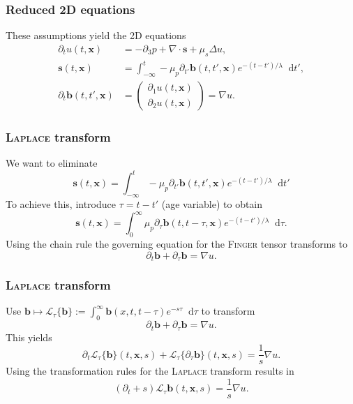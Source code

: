 \documentclass[12pt,a4paper,handout]{beamer}
\theoremstyle{definition}
\theoremstyle{plain}
\newcommand{\bfb}{\bm{b}}
\newcommand{\bfs}{\bm{s}}
\newcommand{\bfx}{\bm{x}}
\newcommand{\D}{\mathop{}\!\mathrm{d}}
\begin{document}
\begin{frame}
    \frametitle{Reduced 2D equations}
    These assumptions yield the 2D equations 
    \begin{align*}
    \partial_t u(t,\bfx) &= -\partial_3 p +\nabla\cdot \bfs+\mu_s\Delta u,\\
    \bfs(t,\bfx) &=\int_{-\infty}^t-\mu_p\partial_{t'}\bfb(t,t',\bfx)e^{-(t-t')/\lambda}\D t',\label{eq:s2D}\\
    \partial_t\bfb(t,t',\bfx)&=
    \begin{pmatrix}
    \partial_1 u(t,\bfx)\\\partial_2 u(t,\bfx)
    \end{pmatrix}=\nabla u.
    \end{align*}
\end{frame}
\begin{frame}
    \frametitle{\textsc{Laplace} transform}
    We want to eliminate \begin{equation*}
        \bfs(t,\bfx)=\int_{-\infty}^t-\mu_p\partial_{t'}\bfb(t,t',\bfx)e^{-(t-t')/\lambda}\D t'
    \end{equation*}
    To achieve this, introduce $\tau=t-t'$ (age variable) to obtain
    \begin{equation*}
    \bfs(t,\bfx)=\int_0^\infty\mu_p\partial_\tau\bfb(t,t-\tau,\bfx)e^{-(t-t')/\lambda}\D\tau.
    \end{equation*}
    Using the chain rule the governing equation for the \textsc{Finger} tensor transforms to  
    \begin{equation*}
    \partial_t \bfb +\partial_\tau\bfb=\nabla u.
    \end{equation*}
\end{frame}
\begin{frame}
    \frametitle{\textsc{Laplace} transform}
    Use $\bfb\mapsto \mathcal{L}_\tau\{\bfb\}:=\int_0^\infty \bfb(x,t,t-\tau)e^{-s\tau}\D \tau$ to transform
    \begin{equation*}
    \partial_t \bfb +\partial_\tau\bfb=\nabla u.
    \end{equation*}
     This yields
    \begin{equation*}
    \partial_t\mathcal{L}_\tau\{\bfb\}(t,\bfx,s) + \mathcal{L}_\tau\{\partial_\tau\bfb\}(t,\bfx,s) = \frac{1}{s}\nabla u.
    \end{equation*} Using the transformation rules for the \textsc{Laplace} transform results in
    \begin{equation*}
        (\partial_t +s)\mathcal{L}_\tau{\bfb}(t,\bfx,s) = \frac{1}{s}\nabla u.
    \end{equation*}
\end{frame}
\end{document}
